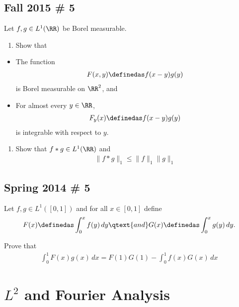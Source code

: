 \hypertarget{fall-2015-5}{%
\subsection{Fall 2015 \# 5}\label{fall-2015-5}}

Let \(f, g \in L^1(\RR)\) be Borel measurable.

\begin{enumerate}
\def\labelenumi{\arabic{enumi}.}
\tightlist
\item
  Show that
\end{enumerate}

\begin{itemize}
\tightlist
\item
  The function
  \begin{align*}F(x, y) \definedas f(x-y) g(y)\end{align*} is Borel
  measurable on \(\RR^2\), and
\item
  For almost every \(y\in \RR\),
  \begin{align*}F_y(x) \definedas f(x-y)g(y)\end{align*} is integrable
  with respect to \(y\).
\end{itemize}

\begin{enumerate}
\def\labelenumi{\arabic{enumi}.}
\setcounter{enumi}{1}
\tightlist
\item
  Show that \(f\ast g \in L^1(\RR)\) and
  \begin{align*}
  \|f * g\|_{1} \leq \|f\|_{1} \|g\|_{1}
  \end{align*}
\end{enumerate}

\hypertarget{spring-2014-5}{%
\subsection{Spring 2014 \# 5}\label{spring-2014-5}}

Let \(f, g \in L^1([0, 1])\) and for all \(x\in [0, 1]\) define
\begin{align*}
F(x) \definedas \int _{0}^{x} f(y) \, dy 
\qtext{and}
G(x)\definedas \int _{0}^{x} g(y) \, dy.
\end{align*}

Prove that
\begin{align*}
\int _{0}^{1} F(x) g(x) \, dx = 
F(1) G(1) - \int _{0}^{1} f(x) G(x) \, dx
\end{align*}

\hypertarget{l2-and-fourier-analysis}{%
\section{\texorpdfstring{\(L^2\) and Fourier
Analysis}{L\^{}2 and Fourier Analysis}}\label{l2-and-fourier-analysis}}

